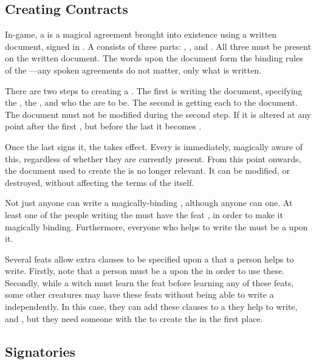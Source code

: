 \subsection{Creating Contracts}

In-game, a {\contract} is a magical agreement brought into existence using a written document, signed in .
A {\contract} consists of three parts: {\stipulations}, {\penalties}, and {\signatories}.
All three must be present on the written document.
The words upon the document form the binding rules of the {\contract}---any spoken agreements do not matter, only what is written.

There are two steps to creating a {\contract}.
The first is writing the document, specifying the {\stipulations}, the {\penalties}, and who the {\signatories} are to be.
The second is getting each {\signatory} to {\sign} the document.
The document must not be modified during the second step.
If it is altered at any point after the first {\signatory} {\signs}, but before the last {\signatory} {\signs} it becomes {\void}.

Once the last {\signatory} signs it, the {\contract} takes effect.
Every {\signatory} is immediately, magically aware of this, regardless of whether they are currently present.
From this point onwards, the document used to create the {\contract} is no longer relevant.
It can be modified, or destroyed, without affecting the terms of the {\contract} itself.

Not just anyone can write a magically-binding {\contract}, although anyone can {\sign} one.
At least one of the people writing the {\contract} must have the feat , in order to make it magically binding.
Furthermore, everyone who helps to write the {\contract} must be a {\signatory} upon it.

Several feats allow extra clauses to be specified upon a {\contract} that a person helps to write.
Firstly, note that a person must be a {\signatory} upon the {\contract} in order to use these.
Secondly, while a witch must learn the feat  before learning any of these feats, some other creatures may have these feats without being able to write a {\contract} independently. %
In this case, they can add these clauses to a {\contract} they help to write, and {\sign}, but they need someone with the  to create the {\contract} in the first place.

\subsection{Signatories}

